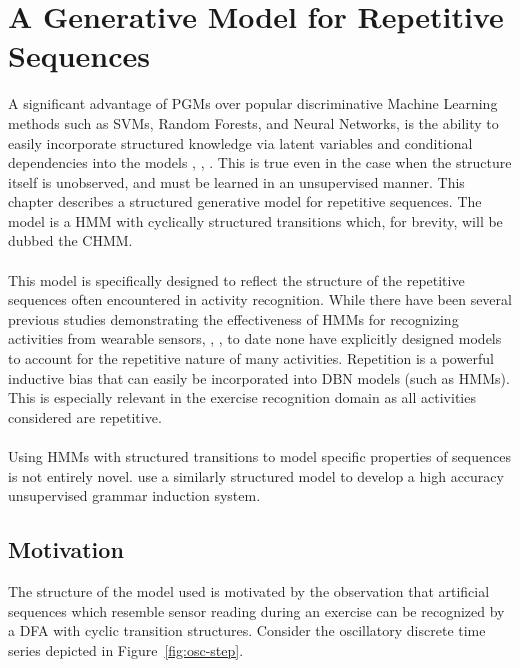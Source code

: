 \documentclass[12pt]{report}
\newcommand{\1}[0]{\mathbbm{1}}
\begin{document}
\chapter{A Generative Model for Repetitive Sequences}
A significant advantage of \acp{PGM} over popular discriminative Machine Learning methods
such as \acp{SVM}, Random Forests, and Neural Networks, is the ability to easily incorporate
structured knowledge via latent variables and conditional dependencies into the models
\cite{structured-priors}, \cite{poverty-stimulus}, \cite{how-to-grow-a-mind}.
This is true even in the case when the structure itself is unobserved, and must
be learned in an unsupervised manner. This chapter describes a structured generative model for
repetitive sequences. The model is a \ac{HMM} with cyclically structured transitions which,
for brevity, will be dubbed the \ac{CHMM}.
\\\\
This model is specifically designed to reflect the structure of the repetitive sequences
often encountered in activity recognition. While there have been several previous studies demonstrating
the effectiveness of \acp{HMM} for recognizing activities from wearable sensors, \cite{hhmm-lee},
\cite{factored-hmm-tran}, to date none have explicitly designed models to account for the repetitive nature
of many activities. Repetition is a powerful inductive bias that can easily be incorporated into
\ac{DBN} models (such as \acp{HMM}). This is especially relevant in the exercise recognition
domain as all activities considered are repetitive.
\\\\
Using \ac{HMM}s with structured transitions to model specific properties of sequences is
not entirely novel. \cite{cascaded-finite-state} use a similarly structured model to develop
a high accuracy unsupervised grammar induction system.

\section{Motivation}
The structure of the model used is motivated by the observation that artificial
sequences which resemble sensor reading during an exercise can be recognized by a \ac{DFA}
with cyclic transition structures. Consider the oscillatory discrete time series depicted
in Figure~\ref{fig:osc-step}.
\end{document}
